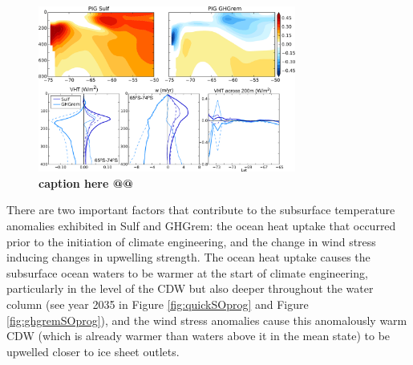 \documentclass[grl]{AGUTeX}  %
\begin{document}
\begin{article}
\begin{figure}[htbp] %
\centering
 \noindent\includegraphics[width=20pc]{figures/TEMPanomvertheat_justPIG.pdf}
\caption{\textbf{caption here @@}}
\label{fig:otemp}
\end{figure}


There are two important factors that contribute to the subsurface temperature anomalies exhibited in Sulf and GHGrem: the ocean heat uptake that occurred prior to the initiation of climate engineering, and the change in wind stress inducing changes in upwelling strength. The ocean heat uptake causes the subsurface ocean waters to be warmer at the start of climate engineering, particularly in the level of the CDW but also deeper throughout the water column (see year 2035 in Figure \ref{fig:quickSOprog} and Figure \ref{fig:ghgremSOprog}), and the wind stress anomalies cause this anomalously warm CDW (which is already warmer than waters above it in the mean state) to be upwelled closer to ice sheet outlets. 


\end{article}
\end{document}
